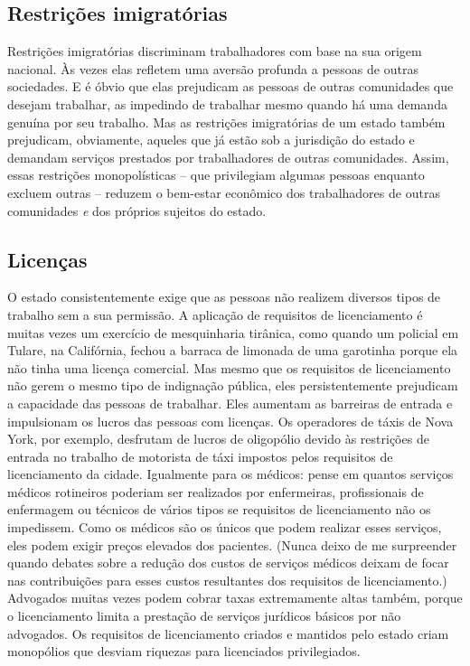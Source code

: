 \subsection*{Restrições imigratórias}

Restrições imigratórias discriminam trabalhadores com base na sua origem nacional. Às vezes elas refletem uma aversão profunda a pessoas de outras sociedades. E é óbvio que elas prejudicam as pessoas de outras comunidades que desejam trabalhar, as impedindo de trabalhar mesmo quando há uma demanda genuína por seu trabalho. Mas as restrições imigratórias de um estado também prejudicam, obviamente, aqueles que já estão sob a jurisdição do estado e demandam serviços prestados por trabalhadores de outras comunidades. Assim, essas restrições monopolísticas -- que privilegiam algumas pessoas enquanto excluem outras -- reduzem o bem-estar econômico dos trabalhadores de outras comunidades \emph{e} dos próprios sujeitos do estado.

\subsection*{Licenças}

O estado consistentemente exige que as pessoas não realizem diversos tipos de trabalho sem a sua permissão. A aplicação de requisitos de licenciamento é muitas vezes um exercício de mesquinharia tirânica, como quando um policial em Tulare, na Califórnia, fechou a barraca de limonada de uma garotinha porque ela não tinha uma licença comercial. Mas mesmo que os requisitos de licenciamento não gerem o mesmo tipo de indignação pública, eles persistentemente prejudicam a capacidade das pessoas de trabalhar. Eles aumentam as barreiras de entrada e impulsionam os lucros das pessoas com licenças. Os operadores de táxis de Nova York, por exemplo, desfrutam de lucros de oligopólio devido às restrições de entrada no trabalho de motorista de táxi impostos pelos requisitos de licenciamento da cidade. Igualmente para os médicos: pense em quantos serviços médicos rotineiros poderiam ser realizados por enfermeiras, profissionais de enfermagem ou técnicos de vários tipos se requisitos de licenciamento não os impedissem. Como os médicos são os únicos que podem realizar esses serviços, eles podem exigir preços elevados dos pacientes. (Nunca deixo de me surpreender quando debates sobre a redução dos custos de serviços médicos deixam de focar nas contribuições para esses custos resultantes dos requisitos de licenciamento.) Advogados muitas vezes podem cobrar taxas extremamente altas também, porque o licenciamento limita a prestação de serviços jurídicos básicos por não advogados. Os requisitos de licenciamento criados e mantidos pelo estado criam monopólios que desviam riquezas para licenciados privilegiados.


